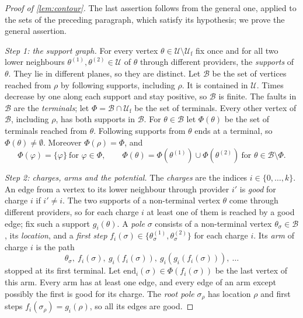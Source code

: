 \begin{proof}[Proof of \cref{lem:contour}]
The last assertion follows from the general one, applied to the sets of the preceding paragraph, which satisfy its hypothesis; we prove the general assertion.

\emph{Step 1: the support graph.} For every vertex $\theta\in\mathcal U\setminus\mathcal U_{\mathrm f}$ fix once and for all two lower neighbours $\theta^{(1)},\theta^{(2)}\in\mathcal U$ of $\theta$ through different providers, the \emph{supports} of $\theta$. They lie in different planes, so they are distinct. Let $\mathcal B$ be the set of vertices reached from $\rho$ by following supports, including $\rho$. It is contained in $\mathcal U$. Times decrease by one along each support and stay positive, so $\mathcal B$ is finite. The faults in $\mathcal B$ are the \emph{terminals}; let $\Phi=\mathcal B\cap\mathcal U_{\mathrm f}$ be the set of terminals. Every other vertex of $\mathcal B$, including $\rho$, has both supports in $\mathcal B$. For $\theta\in\mathcal B$ let $\Phi(\theta)$ be the set of terminals reached from $\theta$. Following supports from $\theta$ ends at a terminal, so $\Phi(\theta)\ne\emptyset$. Moreover $\Phi(\rho)=\Phi$, and
\begin{equation}\label{fgt:eq-Phi}
\Phi(\varphi)=\{\varphi\}\ \text{for }\varphi\in\Phi,\qquad \Phi(\theta)=\Phi(\theta^{(1)})\cup\Phi(\theta^{(2)})\ \text{for }\theta\in\mathcal B\setminus\Phi.
\end{equation}

\emph{Step 2: charges, arms and the potential.} The \emph{charges} are the indices $i\in\{0,\dots,k\}$. An edge from a vertex to its lower neighbour through provider $i'$ is \emph{good} for charge $i$ if $i'\ne i$. The two supports of a non-terminal vertex $\theta$ come through different providers, so for each charge $i$ at least one of them is reached by a good edge; fix such a support $g_i(\theta)$. A \emph{pole} $\sigma$ consists of a non-terminal vertex $\theta_\sigma\in\mathcal B$, its \emph{location}, and a \emph{first step} $f_i(\sigma)\in\{\theta_\sigma^{(1)},\theta_\sigma^{(2)}\}$ for each charge $i$. Its \emph{arm} of charge $i$ is the path
\[
\theta_\sigma,\ f_i(\sigma),\ g_i(f_i(\sigma)),\ g_i(g_i(f_i(\sigma))),\ \dots
\]
stopped at its first terminal. Let $\mathrm{end}_i(\sigma)\in\Phi(f_i(\sigma))$ be the last vertex of this arm. Every arm has at least one edge, and every edge of an arm except possibly the first is good for its charge. The \emph{root pole} $\sigma_\rho$ has location $\rho$ and first steps $f_i(\sigma_\rho)=g_i(\rho)$, so all its edges are good.


\end{proof}
